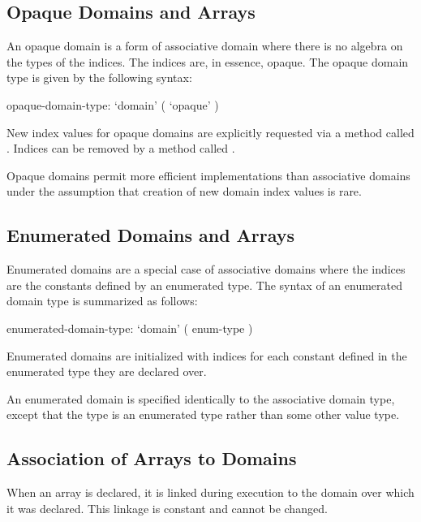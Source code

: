 \subsection{Opaque Domains and Arrays}
\label{Opaque_Domains_and_Arrays}

An opaque domain is a form of associative domain where there is no
algebra on the types of the indices.  The indices are, in essence,
opaque.  The opaque domain type is given by the following syntax:
\begin{syntax}
opaque-domain-type:
  `domain' ( `opaque' )
\end{syntax}

New index values for opaque domains are explicitly requested via a
method called .  Indices can be removed by a method
called .

Opaque domains permit more efficient implementations than associative
domains under the assumption that creation of new domain index values
is rare.

\subsection{Enumerated Domains and Arrays}
\label{Enumerated_Domains_and_Arrays}

Enumerated domains are a special case of associative domains where the
indices are the constants defined by an enumerated type.  The syntax
of an enumerated domain type is summarized as follows:
\begin{syntax}
enumerated-domain-type:
  `domain' ( enum-type )
\end{syntax}

Enumerated domains are initialized with indices for each constant
defined in the enumerated type they are declared over.

An enumerated domain is specified identically to the associative
domain type, except that the type is an enumerated type rather than
some other value type.

\subsection{Association of Arrays to Domains}
\label{Association_of_Arrays_to_Domains}

When an array is declared, it is linked during execution to the domain
over which it was declared.  This linkage is constant and cannot be
changed.

